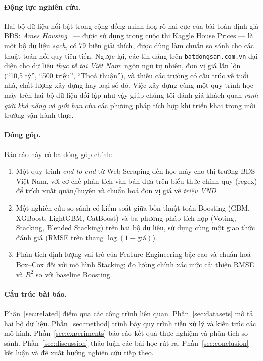 \documentclass[sigconf,nonacm]{acmart}
\begin{document}
\paragraph{Động lực nghiên cứu.}
Hai bộ dữ liệu nổi bật trong cộng đồng minh hoạ rõ hai cực của bài
toán định giá BĐS: \emph{Ames Housing}~\cite{decock2011ames} ---
được sử dụng trong cuộc thi Kaggle House Prices --- là một bộ dữ
liệu \emph{sạch}, có 79 biến giải thích, được dùng làm chuẩn so sánh
cho các thuật toán hồi quy tiên tiến. Ngược lại, các tin đăng trên
\texttt{batdongsan.com.vn} đại diện cho dữ liệu \emph{thực tế tại Việt
Nam}: ngôn ngữ tự nhiên, đơn vị giá lẫn lộn (``10,5 tỷ'', ``500
triệu'', ``Thoả thuận''), và thiếu các trường có cấu trúc về tuổi
nhà, chất lượng xây dựng hay loại sổ đỏ. Việc xây dựng cùng một quy
trình học máy trên hai bộ dữ liệu đối lập như vậy giúp chúng tôi đánh
giá khách quan \emph{ranh giới khả năng và giới hạn} của các phương
pháp tích hợp khi triển khai trong môi trường vận hành thực.

\paragraph{Đóng góp.}
Báo cáo này có ba đóng góp chính:
\begin{enumerate}
  \item Một quy trình \emph{end-to-end} từ Web Scraping đến học máy
    cho thị trường BĐS Việt Nam, với cơ chế phân tích văn bản dựa
    trên biểu thức chính quy (regex) để trích xuất quận/huyện và
    chuẩn hoá đơn vị giá về \emph{triệu VND}.
  \item Một nghiên cứu so sánh có kiểm soát giữa bốn thuật toán
    Boosting (GBM, XGBoost, LightGBM, CatBoost) và ba phương pháp
    tích hợp (Voting, Stacking, Blended Stacking) trên hai bộ dữ
    liệu, sử dụng cùng một giao thức đánh giá (RMSE trên thang $\log
    (1+\text{giá})$).
  \item Phân tích định lượng vai trò của Feature Engineering bậc cao
    và chuẩn hoá Box--Cox đối với mô hình Stacking; đo lường chính
    xác mức cải thiện RMSE và $R^2$ so với baseline Boosting.
\end{enumerate}

\paragraph{Cấu trúc bài báo.}
Phần~\ref{sec:related} điểm qua các công trình liên quan. Phần~\ref{sec:datasets}
mô tả hai bộ dữ liệu. Phần~\ref{sec:method} trình bày quy trình tiền xử
lý và kiến trúc các mô hình. Phần~\ref{sec:experiments} báo cáo kết quả
thực nghiệm và phân tích so sánh. Phần~\ref{sec:discussion} thảo luận
các bài học rút ra. Phần~\ref{sec:conclusion} kết luận và đề xuất
hướng nghiên cứu tiếp theo.
\end{document}

